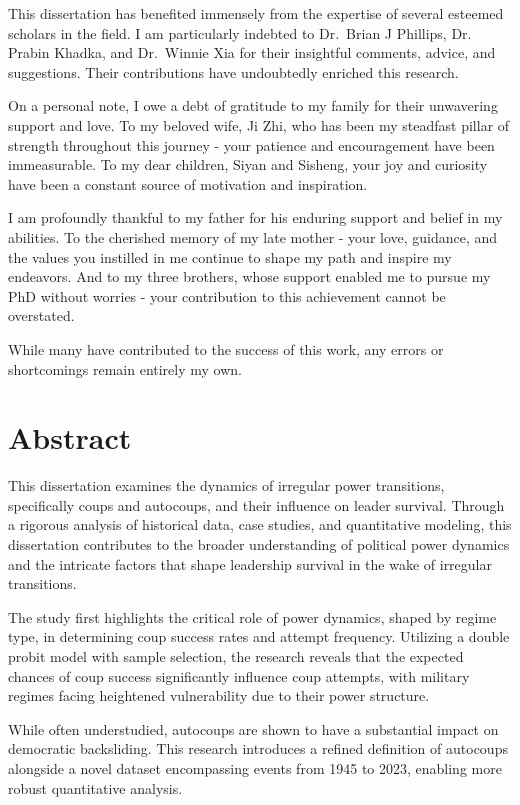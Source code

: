\documentclass[
  12pt,
]{report}
\begin{document}
This dissertation has benefited immensely from the expertise of several
esteemed scholars in the field. I am particularly indebted to Dr.~Brian
J Phillips, Dr. Prabin Khadka, and Dr.~Winnie Xia for their insightful
comments, advice, and suggestions. Their contributions have undoubtedly
enriched this research.

On a personal note, I owe a debt of gratitude to my family for their
unwavering support and love. To my beloved wife, Ji Zhi, who has been my
steadfast pillar of strength throughout this journey - your patience and
encouragement have been immeasurable. To my dear children, Siyan and
Sisheng, your joy and curiosity have been a constant source of
motivation and inspiration.

I am profoundly thankful to my father for his enduring support and
belief in my abilities. To the cherished memory of my late mother - your
love, guidance, and the values you instilled in me continue to shape my
path and inspire my endeavors. And to my three brothers, whose support
enabled me to pursue my PhD without worries - your contribution to this
achievement cannot be overstated.

While many have contributed to the success of this work, any errors or
shortcomings remain entirely my own.

\chapter*{Abstract}\label{abstract}

This dissertation examines the dynamics of irregular power transitions,
specifically coups and autocoups, and their influence on leader
survival. Through a rigorous analysis of historical data, case studies,
and quantitative modeling, this dissertation contributes to the broader
understanding of political power dynamics and the intricate factors that
shape leadership survival in the wake of irregular transitions.

The study first highlights the critical role of power dynamics, shaped
by regime type, in determining coup success rates and attempt frequency.
Utilizing a double probit model with sample selection, the research
reveals that the expected chances of coup success significantly
influence coup attempts, with military regimes facing heightened
vulnerability due to their power structure.

While often understudied, autocoups are shown to have a substantial
impact on democratic backsliding. This research introduces a refined
definition of autocoups alongside a novel dataset encompassing events
from 1945 to 2023, enabling more robust quantitative analysis.
\end{document}

